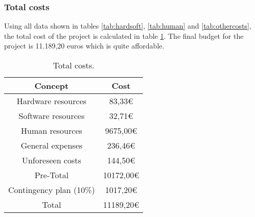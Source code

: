 \subsubsection{Total costs}
Using all data shown in tables \ref{tab:hardsoft}, \ref{tab:human} and \ref{tab:othercosts}, the total cost of the project is calculated in table \ref{tab:total}.
The final budget for the project is 11.189,20 euros which is quite affordable.

\begin{table}[!htb]
\centering
  \begin{tabular}{| c | c |}
  \hline Concept & Cost \\ \hline 
  Hardware resources & 83,33€  \\ \hline
  Software resources & 32,71€        \\ \hline 
  Human resources & 9675,00€        \\ \hline 
  General expenses & 236,46€        \\ \hline 
  Unforeseen costs & 144,50€        \\ \hline \hline
  Pre-Total & 10172,00€  \\ \hline 
  Contingency plan (10\%) & 1017,20€        \\ \hline \hline 
  Total & 11189,20€  \\ \hline 
  \end{tabular}
  \caption{Total costs.} \vspace{3pt}
  \label{tab:total}
\end{table}